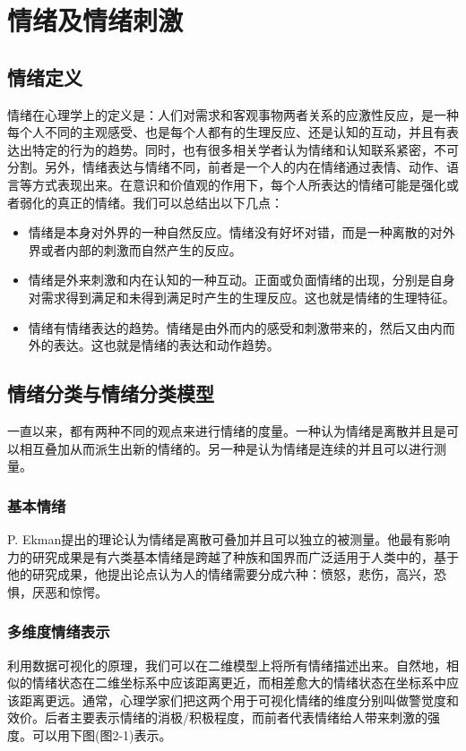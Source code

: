 
\chapter{情绪及情绪刺激}
\label{chap:chap2}
	


\section{情绪定义}
情绪在心理学上的定义是：人们对需求和客观事物两者关系的应激性反应，是一种每个人不同的主观感受、也是每个人都有的生理反应、还是认知的互动，并且有表达出特定的行为的趋势。同时，也有很多相关学者认为情绪和认知联系紧密，不可分割。另外，情绪表达与情绪不同，前者是一个人的内在情绪通过表情、动作、语言等方式表现出来。在意识和价值观的作用下，每个人所表达的情绪可能是强化或者弱化的真正的情绪。我们可以总结出以下几点：
\begin{itemize}
  \item 情绪是本身对外界的一种自然反应。情绪没有好坏对错，而是一种离散的对外界或者内部的刺激而自然产生的反应。
  \item 情绪是外来刺激和内在认知的一种互动。正面或负面情绪的出现，分别是自身对需求得到满足和未得到满足时产生的生理反应。这也就是情绪的生理特征。
  \item 情绪有情绪表达的趋势。情绪是由外而内的感受和刺激带来的，然后又由内而外的表达。这也就是情绪的表达和动作趋势。
\end{itemize}

\section{情绪分类与情绪分类模型}
	一直以来，都有两种不同的观点来进行情绪的度量。一种认为情绪是离散并且是可以相互叠加从而派生出新的情绪的。另一种是认为情绪是连续的并且可以进行测量。
	 \subsection{基本情绪}
	 P. Ekman提出的理论认为情绪是离散可叠加并且可以独立的被测量。他最有影响力的研究成果是有六类基本情绪是跨越了种族和国界而广泛适用于人类中的，基于他的研究成果，他提出论点认为人的情绪需要分成六种：愤怒，悲伤，高兴，恐惧，厌恶和惊愕。
	 \subsection{多维度情绪表示}
	 利用数据可视化的原理，我们可以在二维模型上将所有情绪描述出来。自然地，相似的情绪状态在二维坐标系中应该距离更近，而相差愈大的情绪状态在坐标系中应该距离更远。通常，心理学家们把这两个用于可视化情绪的维度分别叫做警觉度和效价。后者主要表示情绪的消极/积极程度，而前者代表情绪给人带来刺激的强度。可以用下图(图2-1)表示。
